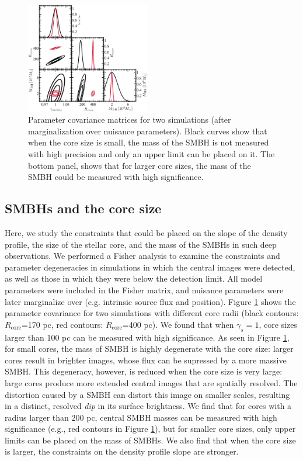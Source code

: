\documentclass[chicago]{emulateapj}
\begin{document}
\begin{figure}
\begin{center}
\centering
\includegraphics[trim= 2 5 0 0, clip, width=0.48\textwidth]{figures/f_04.eps}
\centering
\end{center}
\caption{ Parameter covariance matrices for two simulations (after marginalization over nuisance parameters). Black curves show that when the core size is small, the mass of the SMBH is not measured with high precision and only an upper limit can be placed on it. The bottom panel, shows that for larger core sizes, the mass of the SMBH could be measured with high significance. 
\label{fig:4}}
\end{figure}



\subsection{SMBHs and the core size}
Here, we study the constraints that could be placed on the slope of the density profile, the size of the stellar core, and the mass of the SMBHs in such deep observations. 
We performed a Fisher analysis to examine the constraints and parameter degeneracies in simulations in which the central images were detected, as well as those in which they were below the detection limit. All model parameters were included in the Fisher matrix, and nuisance parameters were later marginalize over (e.g. intrinsic source flux and position).  
 Figure \ref{fig:4} shows the parameter covariance for two simulations with different core radii (black contours:  $R_{\mathrm{core}}$=170 pc, red contours: $R_{\mathrm{core}}$=400 pc).
We found that when $\gamma_s=1$, core sizes larger than 100 pc can be measured with high significance. As seen in Figure \ref{fig:4}, 
for small cores, the mass of SMBH is highly degenerate with the core size: larger cores result in brighter images, whose flux can be supressed by a more massive SMBH.
This degeneracy,  however,  is reduced when the core size is very large: large cores produce more extended central images that are spatially resolved. The distortion caused by a SMBH can distort this image on smaller scales, resulting in a distinct, resolved \emph{dip} in its surface brightness. 
We find that for cores with a radius larger than $200$ pc, central SMBH masses can be measured with high significance (e.g., red contours in Figure \ref{fig:4}), but for smaller core sizes, only upper limits can be placed on the mass of SMBHs.
We also find that when the core size is larger, the constraints on the density profile slope are stronger.
\end{document}

